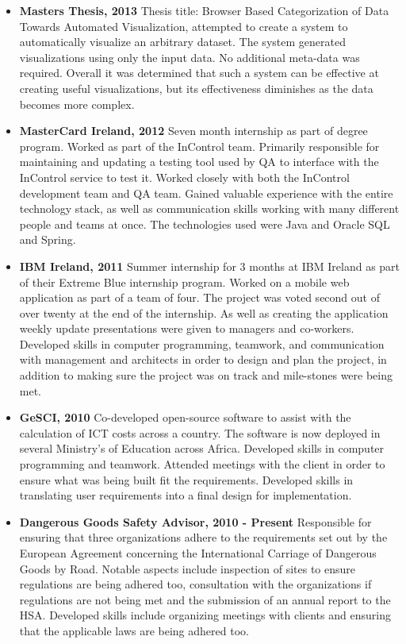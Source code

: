 \documentclass{res}
\begin{document}
\begin{resume}
\begin{itemize}
    \item{{\bf Masters Thesis, 2013}} Thesis title: Browser Based Categorization of Data Towards Automated Visualization, attempted to create a system to automatically visualize an arbitrary dataset. The system generated visualizations using only the input data. No additional meta-data was required. Overall it was determined that such a system can be effective at creating useful visualizations, but its effectiveness diminishes as the data becomes more complex.\\


    \item{{\bf MasterCard Ireland, 2012}} Seven month internship as part of degree program. Worked as part of the InControl team. Primarily responsible for maintaining and updating a testing tool used by QA to interface with the InControl service to test it. Worked closely with both the InControl development team and QA team. Gained valuable experience with the entire technology stack, as well as communication skills working with many different people and teams at once. The technologies used were Java and Oracle SQL and Spring.\\
   
     
    \item{{\bf IBM Ireland, 2011}} Summer internship for 3 months at IBM Ireland as part of their Extreme Blue internship program. Worked on a mobile web application as part of a team of four. The project was voted second out of over twenty at the end of the internship. As well as creating the application weekly update presentations were given to managers and co-workers. Developed skills in computer programming, teamwork, and communication with management and architects in order to design and plan the project, in addition to making sure the project was on track and mile-stones were being met.\\
    
 
    \item{{\bf GeSCI, 2010}} Co-developed open-source software to assist with the calculation of ICT costs across a country. The software is now deployed in several Ministry's of Education across Africa. Developed skills in computer programming and teamwork. Attended meetings with the client in order to ensure what was being built fit the requirements. Developed skills in translating user requirements into a final design for implementation.\\

    \item{{\bf Dangerous Goods Safety Advisor, 2010 - Present}} Responsible for ensuring that three organizations adhere to the requirements set out by the European Agreement concerning the International Carriage of Dangerous Goods by Road. Notable aspects include inspection of sites to ensure regulations are being adhered too, consultation with the organizations if regulations are not being met and the submission of an annual report to the HSA. Developed skills include organizing meetings with clients and ensuring that the applicable laws are being adhered too.\\
 

\end{itemize}
\end{resume}
\end{document}
